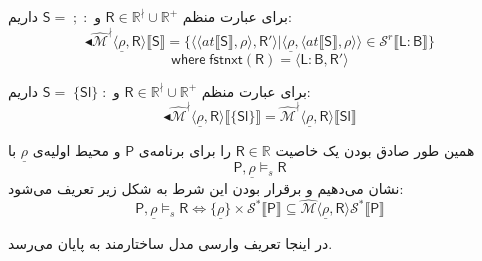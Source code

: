 برای عبارت منظم 
$\mathsf{R} \in \mathbb{R}^\nmid \cup \mathbb{R^+}$
و 
$\mathsf{S= \; ; \;:}$
داریم:
$$\blacktriangleleft\mathcal{\hat{M}^\nmid}  \langle \underline{\rho}, \mathsf{R} \rangle \llbracket \mathsf{S} \rrbracket = \{\langle \langle at \llbracket \mathsf{S} \rrbracket , \rho \rangle , \mathsf{R'} \rangle | \langle \underline{\rho}, \langle at \llbracket \mathsf{S} \rrbracket , \rho \rangle \rangle \in \mathcal{S}^r \llbracket \mathsf{L:B}\rrbracket\}$$
$$\mathsf{where \; fstnxt (R) = \langle L:B,R' \rangle}$$
	
	

برای عبارت منظم 
$\mathsf{R} \in \mathbb{R}^\nmid \cup \mathbb{R^+}$
و 
$\mathsf{S= \; \{Sl\} \;:}$
داریم:
$$\blacktriangleleft \mathcal{\hat{M}^\nmid} \langle \underline{\rho}, \mathsf{R} \rangle \llbracket \{\mathsf{Sl}\} \rrbracket =
 \mathcal{\hat{M}^\nmid} \langle \underline{\rho}, \mathsf{R} \rangle \llbracket \mathsf{Sl} \rrbracket$$


همین طور صادق بودن یک خاصیت $\mathsf{R} \in \mathbb{R}$ را برای برنامه‌ی $\mathsf{P}$ و محیط اولیه‌ی $\underline{\rho}$ با 
$$\mathsf{P} , \underline{\rho} \models_s \mathsf{R}$$
نشان می‌دهیم و برقرار بودن این شرط به شکل زیر تعریف می‌شود:
$$\mathsf{P} , \underline{\rho} \models_s \mathsf{R} \iff \{\underline{\rho}\} \times \mathcal{S}^* \llbracket \mathsf{P} \rrbracket \subseteq \hat{\mathcal{M}} \langle \underline{\rho} , \mathsf{R} \rangle \mathcal{S}^* \llbracket \mathsf{P} \rrbracket$$



در اینجا تعریف وارسی مدل ساختارمند به پایان می‌رسد.
 
 
 
 
 
 
 
 
 
 